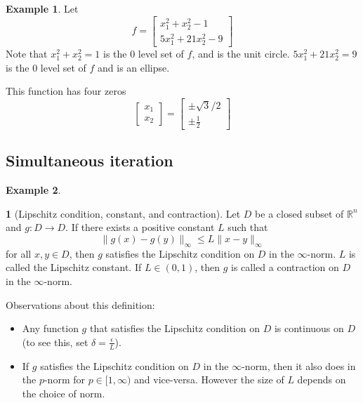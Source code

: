 \documentclass[12pt]{article}
\theoremstyle{definition}
\newtheorem{definition}{\color{NavyBlue}{\textbf{Definition}}}
\newcommand{\e}{\epsilon}
\newcommand{\R}{\mathbb{R}}
\newcommand{\norm}[1]{\lVert#1\rVert}
\newtheorem{example}{\color{WildStrawberry}Example}
\theoremstyle{definition}
\begin{document}
\begin{example}
Let 
\begin{equation}
	f = 
	\begin{bmatrix}
	x_1^2 + x_2^2 - 1 \\
	5x_1^2 + 21x_2^2 - 9
	\end{bmatrix}
\end{equation}
Note that $x_1^2 + x_2^2 = 1$ is the $0$ level set of $f$, and is the unit circle. $5x_1^2 + 21x_2^2 = 9$ is the $0$ level set of $f$ and is an ellipse. 

This function has four zeros
\begin{equation}
	\begin{bmatrix}
	x_1 \\ x_2
	\end{bmatrix}
	=
	\begin{bmatrix}
	\pm \sqrt{3}/2 \\
	\pm \frac{1}{2}
	\end{bmatrix}
\end{equation}
\end{example}

\subsection{Simultaneous iteration}

\begin{example}

\end{example}


\begin{definition}[Lipschitz condition, constant, and contraction]
Let $D$ be a closed subset of $\R^n$ and $g: D \to D$. If there exists a positive constant $L$ such that
\begin{equation}
	\norm{g(x) - g(y)}_\infty \leq L \norm{x - y}_\infty
\end{equation}
for all $x, y \in D$, then $g$ satisfies the Lipschitz condition on $D$ in the $\infty$-norm. $L$ is called the Lipschitz constant. If $L \in (0,1)$, then $g$ is called a contraction on $D$ in the $\infty$-norm. 
\end{definition}

Observations about this definition:
\begin{itemize}
	\item Any function $g$ that satisfies the Lipschitz condition on $D$ is continuous on $D$ (to see this, set $\delta = \frac{\e}{L}$). 
	\item If $g$ satisfies the Lipschitz condition on $D$ in the $\infty$-norm, then it also does in the $p$-norm for $p \in [1, \infty)$ and vice-versa. However the size of $L$ depends on the choice of norm. 
\end{itemize}
\end{document}
